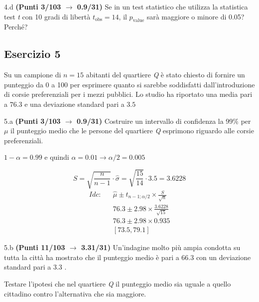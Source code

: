 \documentclass[
  11pt,
]{book}
\theoremstyle{mytheoremstyle}
\theoremstyle{mydefstyle}
\newenvironment{sol}
  {
  \begin{tcolorbox}[enhanced,breakable,arc=0.1mm,boxrule=1pt,colback=white,colframe=iblue,
  title=\bf \fontfamily{lmss}\selectfont \hspace{.5 cm} Soluzione,drop fuzzy shadow]

}{
\end{tcolorbox}
  }
\begin{document}
4.d \textbf{(Punti 3/103 \(\rightarrow\) 0.9/31)} Se in un test statistico che utilizza la statistica test \emph{t} con 10 gradi di libertà \(t_\text{obs}=14\), il \(p_\text{value}\) sarà maggiore o minore di 0.05? Perché?

\subsection{Esercizio 5}\label{esercizio-5-13}

Su un campione di \(n=15\) abitanti del quartiere \emph{Q} è stato chiesto di fornire un punteggio da 0 a 100 per esprimere quanto si sarebbe soddisfatti dall'introduzione di corsie preferenziali per i mezzi pubblici. Lo studio ha riportato una media pari a \(76.3\) e una deviazione standard pari a \(3.5\)

5.a \textbf{(Punti 3/103 \(\rightarrow\) 0.9/31)} Costruire un intervallo di confidenza la 99\% per \(\mu\) il punteggio medio che le persone del quartiere \emph{Q} esprimono riguardo alle corsie preferenziali.

\begin{sol}
\(1-\alpha =0.99\) e quindi \(\alpha=0.01\rightarrow \alpha/2=0.005\)

\[
      S  =\sqrt{\frac {n}{n-1}}\cdot\hat\sigma =
     \sqrt{\frac { 15 }{ 14 }}\cdot 3.5 = 3.6228 
\]
\begin{eqnarray*}
  Idc: & &  \hat\mu \pm  t_{n-1;\alpha/2} \times \frac{S}{\sqrt{n}} \\
     & &  76.3 \pm  2.98 \times \frac{ 3.6228 }{\sqrt{ 15 }} \\
     & &  76.3 \pm  2.98 \times  0.935 \\
     & & [ 73.5 ,  79.1 ]
\end{eqnarray*}

\end{sol}

5.b \textbf{(Punti 11/103 \(\rightarrow\) 3.31/31)} Un'indagine molto più ampia condotta su tutta la città ha mostrato che
il punteggio medio è pari a 66.3 con un deviazione standard pari a 3.3 .

Testare l'ipotesi che nel quartiere \emph{Q} il punteggio medio sia uguale a quello cittadino contro l'alternativa che sia maggiore.
\end{document}
